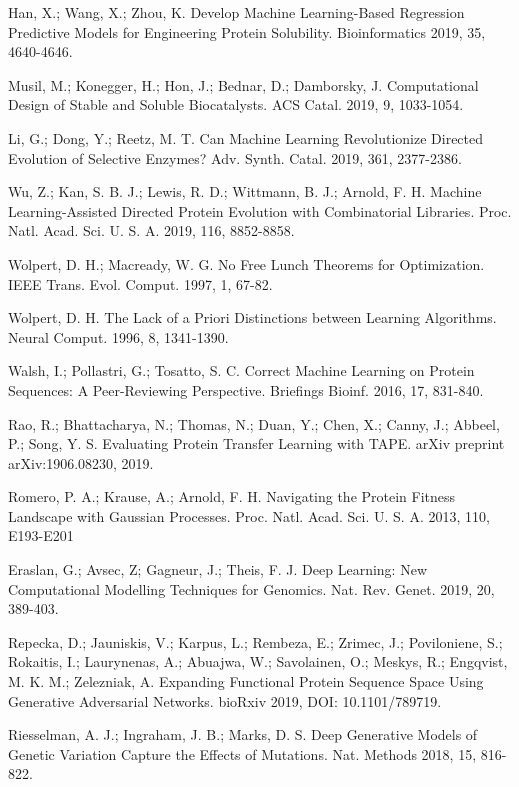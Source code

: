 \documentclass[12pt]{article}
\begin{document}
\begin{thebibliography}{99}
 Han, X.; Wang, X.; Zhou, K. Develop Machine Learning-Based Regression Predictive Models for Engineering Protein Solubility. Bioinformatics 2019, 35, 4640-4646.

 Musil, M.; Konegger, H.; Hon, J.; Bednar, D.; Damborsky, J. Computational Design of Stable and Soluble Biocatalysts. ACS Catal. 2019, 9, 1033-1054.

 Li, G.; Dong, Y.; Reetz, M. T. Can Machine Learning Revolutionize Directed Evolution of Selective Enzymes? Adv. Synth. Catal. 2019, 361, 2377-2386. 

 Wu, Z.; Kan, S. B. J.; Lewis, R. D.; Wittmann, B. J.; Arnold, F. H. Machine Learning-Assisted Directed Protein Evolution with Combinatorial Libraries. Proc. Natl. Acad. Sci. U. S. A. 2019, 116, 8852-8858.

 Wolpert, D. H.; Macready, W. G. No Free Lunch Theorems for Optimization. IEEE Trans. Evol. Comput. 1997, 1, 67-82.

 Wolpert, D. H. The Lack of a Priori Distinctions between Learning Algorithms. Neural Comput. 1996, 8, 1341-1390.

 Walsh, I.; Pollastri, G.; Tosatto, S. C. Correct Machine Learning on Protein Sequences: A Peer-Reviewing Perspective. Briefings Bioinf. 2016, 17, 831-840.

 Rao, R.; Bhattacharya, N.; Thomas, N.; Duan, Y.; Chen, X.; Canny, J.; Abbeel, P.; Song, Y. S. Evaluating Protein Transfer Learning with TAPE. arXiv preprint arXiv:1906.08230, 2019.


 Romero, P. A.; Krause, A.; Arnold, F. H. Navigating the Protein Fitness Landscape with Gaussian Processes. Proc. Natl. Acad. Sci. U. S. A. 2013, 110, E193-E201

 Eraslan, G.; Avsec, Z; Gagneur, J.; Theis, F. J. Deep Learning: New Computational Modelling Techniques for Genomics. Nat. Rev. Genet. 2019, 20, 389-403.

 Repecka, D.; Jauniskis, V.; Karpus, L.; Rembeza, E.; Zrimec, J.; Poviloniene, S.; Rokaitis, I.; Laurynenas, A.; Abuajwa, W.; Savolainen, O.; Meskys, R.; Engqvist, M. K. M.; Zelezniak, A. Expanding Functional Protein Sequence Space Using Generative Adversarial Networks. bioRxiv 2019, DOI: 10.1101/789719.

 Riesselman, A. J.; Ingraham, J. B.; Marks, D. S. Deep Generative Models of Genetic Variation Capture the Effects of Mutations. Nat. Methods 2018, 15, 816-822.


\end{thebibliography}
\end{document}
